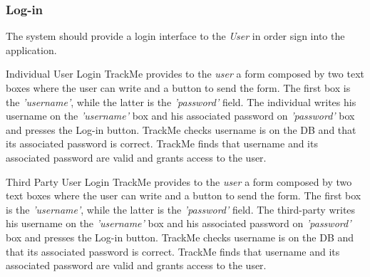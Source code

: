 \documentclass[a4paper]{article}
\begin{document}
        \subsubsection{Log-in}
        The system should provide a login interface to the \textit{User} in order sign into the application.
        
        \begin{usecase}{Individual User Login}
              {TrackMe provides to the \textit{user} a form composed by two text boxes where the user can write and a button to send the form. The first box is the \textit{'username'}, while the latter is the \textit{'password'} field.}
              {The individual writes his username on the \textit{'username'} box and his associated password on \textit{'password'} box and presses the Log-in button.}
              {TrackMe checks username is on the DB and that its associated password is correct.}
              {TrackMe finds that username and its associated password are valid and grants access to the user.}
        \end{usecase}
        
        \begin{usecase}{Third Party User Login}
        {TrackMe provides to the \textit{user} a form composed by two text boxes where the user can write and a button to send the form. The first box is the \textit{'username'}, while the latter is the \textit{'password'} field.}
        {The third-party writes his username on the \textit{'username'} box and his associated password on \textit{'password'} box and presses the Log-in button.}
        {TrackMe checks username is on the DB and that its associated password is correct.}
        {TrackMe finds that username and its associated password are valid and grants access to the user.}
        \end{usecase}
        
\end{document}

